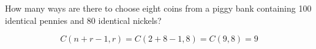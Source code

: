 \documentclass[../main.tex]{subfiles}
\begin{document}
How many ways are there to choose eight coins from a piggy bank containing 100 identical pennies and 80 identical nickels?

\solution

\[
C(n+r-1, r) = C(2 + 8 - 1, 8) = C(9, 8) = 9
\]
\end{document}
